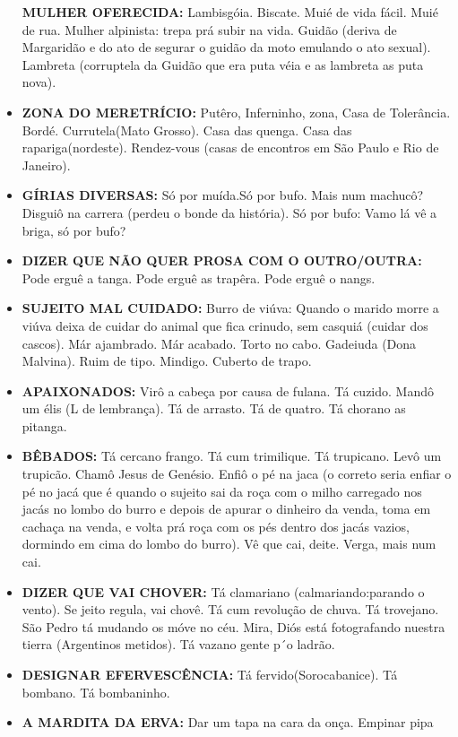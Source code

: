\documentclass[12pt,brazil,]{book}
\begin{document}
\begin{itemize}
  \textbf{MULHER OFERECIDA:} Lambisgóia. Biscate. Muié de vida fácil.
  Muié de rua. Mulher alpinista: trepa prá subir na vida. Guidão (deriva
  de Margaridão e do ato de segurar o guidão da moto emulando o ato
  sexual). Lambreta (corruptela da Guidão que era puta véia e as
  lambreta as puta nova).
\item
  \textbf{ZONA DO MERETRÍCIO:} Putêro, Inferninho, zona, Casa de
  Tolerância. Bordé. Currutela(Mato Grosso). Casa das quenga. Casa das
  rapariga(nordeste). Rendez-vous (casas de encontros em São Paulo e Rio
  de Janeiro).
\item
  \textbf{GÍRIAS DIVERSAS:} Só por muída.Só por bufo. Mais num machucô?
  Disguiô na carrera (perdeu o bonde da história). Só por bufo: Vamo lá
  vê a briga, só por bufo?
\item
  \textbf{DIZER QUE NÃO QUER PROSA COM O OUTRO/OUTRA:} Pode erguê a
  tanga. Pode erguê as trapêra. Pode erguê o nangs.
\item
  \textbf{SUJEITO MAL CUIDADO:} Burro de viúva: Quando o marido morre a
  viúva deixa de cuidar do animal que fica crinudo, sem casquiá (cuidar
  dos cascos). Már ajambrado. Már acabado. Torto no cabo. Gadeiuda (Dona
  Malvina). Ruim de tipo. Mindigo. Cuberto de trapo.\\
\item
  \textbf{APAIXONADOS:} Virô a cabeça por causa de fulana. Tá cuzido.
  Mandô um élis (L de lembrança). Tá de arrasto. Tá de quatro. Tá
  chorano as pitanga.
\item
  \textbf{BÊBADOS:} Tá cercano frango. Tá cum trimilique. Tá trupicano.
  Levô um trupicão. Chamô Jesus de Genésio. Enfiô o pé na jaca (o
  correto seria enfiar o pé no jacá que é quando o sujeito sai da roça
  com o milho carregado nos jacás no lombo do burro e depois de apurar o
  dinheiro da venda, toma em cachaça na venda, e volta prá roça com os
  pés dentro dos jacás vazios, dormindo em cima do lombo do burro). Vê
  que cai, deite. Verga, mais num cai.
\item
  \textbf{DIZER QUE VAI CHOVER:} Tá clamariano (calmariando:parando o
  vento). Se jeito regula, vai chovê. Tá cum revolução de chuva. Tá
  trovejano. São Pedro tá mudando os móve no céu. Mira, Diós está
  fotografando nuestra tierra (Argentinos metidos). Tá vazano gente p´o
  ladrão.
\item
  \textbf{DESIGNAR EFERVESCÊNCIA:} Tá fervido(Sorocabanice). Tá bombano.
  Tá bombaninho.\\
\item
  \textbf{A MARDITA DA ERVA:} Dar um tapa na cara da onça. Empinar pipa

\end{itemize}
\end{document}
